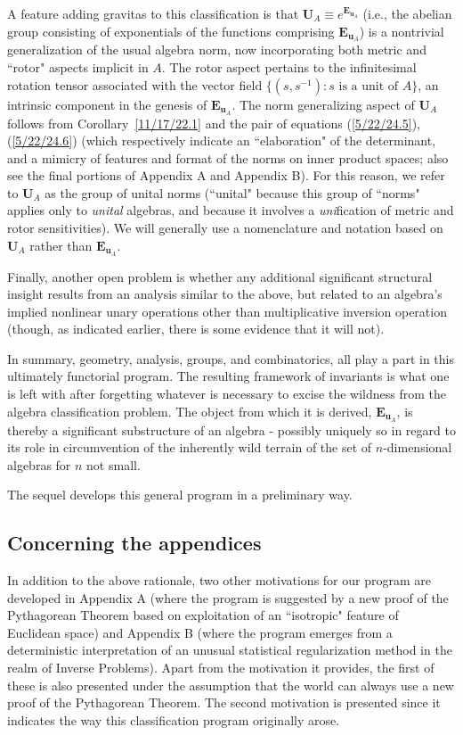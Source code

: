 \documentclass{amsart}
\numberwithin{equation}{section}
\theoremstyle{definition}
\numberwithin{theorem}{section}
\begin{document}
A feature adding gravitas to this classification is that $\mathbf{U}_A\equiv e^{\mathbf{E}_{\mathbf{u}_A}}$ (i.e., the abelian group consisting of exponentials of the functions comprising $\mathbf{E}_{\mathbf{u}_A}$) is a nontrivial generalization of the usual algebra norm, now incorporating both metric and ``rotor" aspects implicit in $A$.  The rotor aspect pertains to the infinitesimal rotation tensor associated with the vector field $\{(s,s^{-1}):s \mbox{ is a unit of } A\}$, an intrinsic component in the genesis of $\mathbf{E}_{\mathbf{u}_A}$.  The norm generalizing aspect of $\mathbf{U}_A$ follows from \mbox{Corollary \ref{11/17/22.1}} and the pair of equations (\ref{5/22/24.5}), (\ref{5/22/24.6}) (which respectively indicate an ``elaboration" of the determinant, and a mimicry of features and format of the norms on inner product spaces; also see the final portions of Appendix A and Appendix B).  For this reason, we refer to $\mathbf{U}_A$ as the group of unital norms (``unital" because this group of ``norms" applies only to {\it unital} algebras, and because it involves a {\it uni}fication of metric and rotor sensitivities).    We will generally use a nomenclature and notation based on $\mathbf{U}_A$ rather than $\mathbf{E}_{\mathbf{u}_A}$.

Finally, another open problem is whether any additional significant structural insight results from an analysis similar to the above, but related to an algebra's implied nonlinear unary operations other than multiplicative inversion operation (though, as indicated earlier, there is some evidence that it will not).
 
 
In summary, geometry, analysis, groups, and combinatorics, all play a part in this ultimately functorial program.  The resulting framework of invariants is what one is left with after forgetting whatever is necessary to excise the wildness from the algebra classification problem.  The object from which it is derived, $\mathbf{E}_{\mathbf{u}_A}$, is thereby a significant substructure of an algebra - possibly uniquely so in regard to its role in circumvention of the inherently wild terrain of the set of $n$-dimensional algebras for $n$ not small.  
  
The sequel develops this general program in a preliminary way.

  \subsection{Concerning the appendices}  In addition to the above rationale, two other motivations for our program are developed in Appendix A (where the program is suggested by a new proof of the Pythagorean Theorem based on exploitation of an ``isotropic" feature of Euclidean space) and Appendix B (where the program emerges from a deterministic interpretation of an unusual statistical regularization method in the realm of Inverse Problems).   Apart from the motivation it provides, the first of these is also presented under the assumption that the world  can always use a new proof of the Pythagorean Theorem.  The second motivation is presented since it indicates the way this classification program  originally arose.
\end{document}

